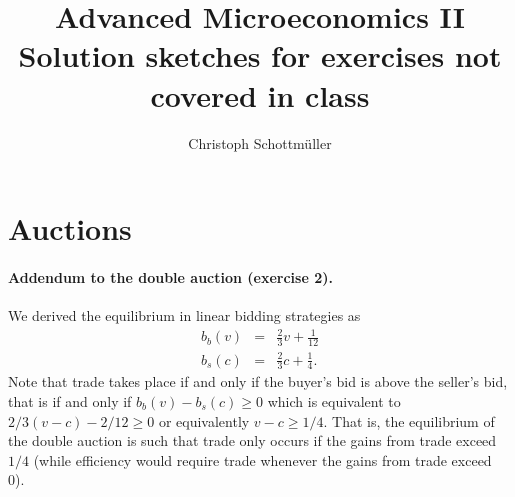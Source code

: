 \documentclass[a4paper,11pt]{article}
\title{Advanced Microeconomics II\\ Solution sketches for exercises not covered in class}
\author{Christoph Schottmüller}
\begin{document}
\maketitle

\section{Auctions}
\label{sec:auctions}

\paragraph{Addendum to the double auction  (exercise 2).} We derived the equilibrium in linear bidding strategies as
\begin{eqnarray*}
  b_b(v)&=&\frac{2}{3}v+\frac{1}{12}\\
  b_s(c)&=&\frac{2}{3}c+\frac{1}{4}.
\end{eqnarray*}
Note that trade takes place if and only if the buyer's bid is above the seller's bid, that is if and only if $b_b(v)-b_s(c)\geq 0$ which is equivalent to $2/3 (v-c)-2/12\geq 0$ or equivalently $v-c\geq 1/4$. That is, the equilibrium of the double auction is such that trade only occurs if the gains from trade exceed $1/4$ (while efficiency would require trade whenever the gains from trade exceed 0).
\end{document}
